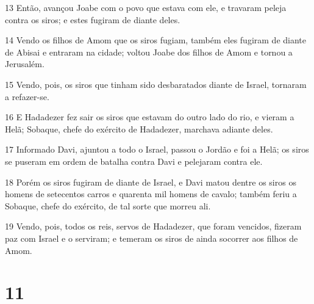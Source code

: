 \par 13 Então, avançou Joabe com o povo que estava com ele, e travaram peleja contra os siros; e estes fugiram de diante deles.
\par 14 Vendo os filhos de Amom que os siros fugiam, também eles fugiram de diante de Abisai e entraram na cidade; voltou Joabe dos filhos de Amom e tornou a Jerusalém.
\par 15 Vendo, pois, os siros que tinham sido desbaratados diante de Israel, tornaram a refazer-se.
\par 16 E Hadadezer fez sair os siros que estavam do outro lado do rio, e vieram a Helã; Sobaque, chefe do exército de Hadadezer, marchava adiante deles.
\par 17 Informado Davi, ajuntou a todo o Israel, passou o Jordão e foi a Helã; os siros se puseram em ordem de batalha contra Davi e pelejaram contra ele.
\par 18 Porém os siros fugiram de diante de Israel, e Davi matou dentre os siros os homens de setecentos carros e quarenta mil homens de cavalo; também feriu a Sobaque, chefe do exército, de tal sorte que morreu ali.
\par 19 Vendo, pois, todos os reis, servos de Hadadezer, que foram vencidos, fizeram paz com Israel e o serviram; e temeram os siros de ainda socorrer aos filhos de Amom.

\chapter{11}

